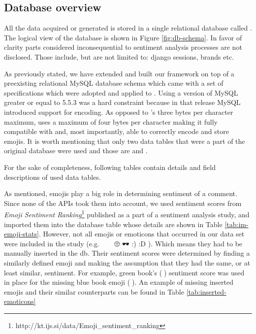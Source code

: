 \newcommand*{\DatabaseOverviewPath}{04-framework/02-implementation/01-database}

\subsection{Database overview\label{sec:database-overview}}
All the data acquired or generated is stored in a single relational database called . 
The logical view of the database is shown in Figure \ref{fig:db-schema}. 
In favor of clarity parts considered inconsequential to sentiment analysis processes are not disclosed. 
Those include, but are not limited to: django sessions, brands etc.


As previously stated, we have extended and built our framework on top of a preexisting relational MySQL database schema which came with a set of specifications which were adopted and applied to .
Using a version of MySQL greater or equal to 5.5.3 was a hard constraint because in that release MySQL introduced support for  encoding.  
As opposed to 's three bytes per character maximum, 
 uses a maximum of four bytes per character making it fully compatible with  and, most importantly, able to correctly encode and store emojis.
It is worth mentioning that only two data tables that were a part of the original database were used and those are  and .

For the sake of completeness, following tables contain details and field descriptions of used data tables. 



\newpage

As mentioned, emojis play a big role in determining sentiment of a comment. 
Since none of the APIs took them into account, we used sentiment scores from \emph{Emoji Sentiment Ranking}\footnote{http://kt.ijs.si/data/Emoji\_sentiment\_ranking} published as a part of a sentiment analysis study\cite{Kralj2015emojis},  and imported them into the database table  whose details are shown in Table \ref{tab:im-emoji-stats}.  
However, not all emojis or emoticons that occurred in our data set were included in the study (e.g. 📘 🍾 🙂 🙄 🕶 :) :D ).
Which means they had to be manually inserted in the db. 
Their sentiment scores were determined by finding a similarly defined emoji and making the assumption that they had the same, or at least similar, sentiment. 
For example, green book's (📗) sentiment score was used in place for the missing blue book emoji (📘). 
An example of missing inserted emojis and their similar counterparts can be found in Table \ref{tab:inserted-emoticons}



